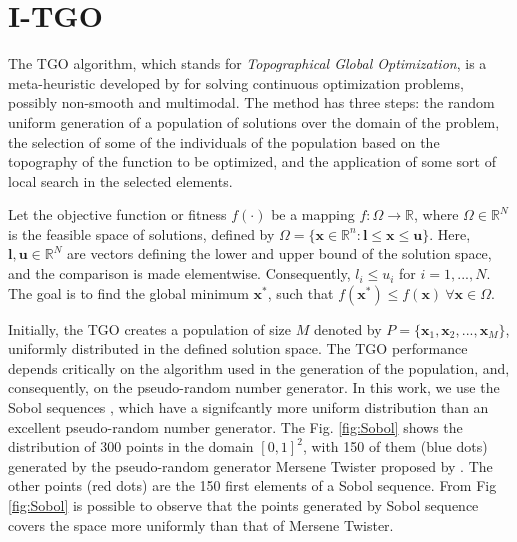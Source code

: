 \section{I-TGO}

The TGO algorithm, which stands for \textit{Topographical Global Optimization}, is a meta-heuristic developed by \cite{ITGO1} for solving continuous optimization problems, possibly non-smooth and multimodal. The method has three steps: the random uniform generation of a population of solutions over the domain of the problem, the selection of some of the individuals of the population based on the topography of the function to be optimized, and the application of some sort of local search in the selected elements.

Let the objective function or fitness $f(\cdot)$ be a mapping $f : \Omega \rightarrow \mathbb{R}$, where $\Omega \in \mathbb{R}^N$ is the feasible space of solutions, defined by $\Omega = \{\bm{x} \in \mathbb{R}^n : \bm{l} \leq \bm{x} \leq \bm{u}\}$. Here, $\bm{l}, \bm{u} \in \mathbb{R}^N$ are vectors defining the lower and upper bound of the solution space, and the comparison is made elementwise. Consequently, $l_i \leq u_i $ for $i = 1, ..., N$. The goal is to find the global minimum $\bm{x^*}$, such that $f(\bm{x^*}) \leq f(\bm{x}) \ \forall \bm{x} \in \Omega$.

Initially, the TGO creates a population of size $M$ denoted by $P = \{\bm{x}_1, \bm{x}_2, ..., \allowbreak \bm{x}_M\}$, uniformly distributed in the defined solution space. The TGO performance depends critically on the algorithm used in the generation of the population, and, consequently, on the pseudo-random number generator. In this work, we use the Sobol sequences \cite{Sobol, ITGO3}, which have a signifcantly more uniform distribution than an excellent pseudo-random number generator. The Fig. \ref{fig:Sobol} shows the distribution of 300 points in the domain $[0, 1]^2$, with 150 of them (blue dots) generated by the pseudo-random generator Mersene Twister proposed by \cite{mt19937}. The other points (red dots) are the 150 first elements of a Sobol sequence. From Fig \ref{fig:Sobol} is possible to observe that the points generated by Sobol sequence covers the space more uniformly than that of Mersene Twister.


